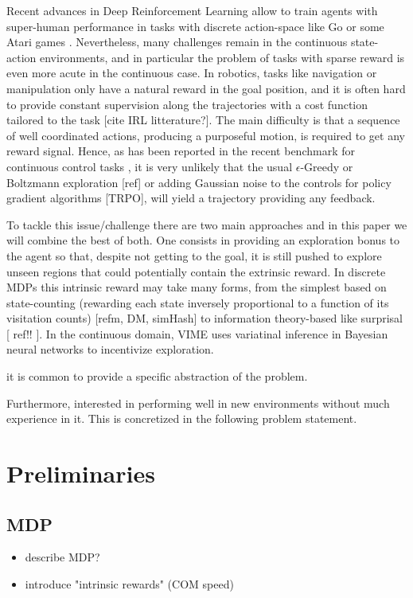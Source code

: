 \documentclass{article} %
\begin{document}
Recent advances in Deep Reinforcement Learning allow to train agents with super-human performance in tasks with discrete action-space like Go \cite{2016go} or some Atari games \cite{mnih2015human}. Nevertheless, many challenges remain in the continuous state-action environments, and in particular the problem of tasks with sparse reward is even more acute in the continuous case. In robotics, tasks like navigation or manipulation only have a natural reward in the goal position, and it is often hard to provide constant supervision along the trajectories with a cost function tailored to the task [cite IRL litterature?]. The main difficulty is that a sequence of well coordinated actions, producing a purposeful motion, is required to get any reward signal. Hence, as has been reported in the recent benchmark for continuous control tasks \cite{yuan2015}, it is very unlikely that the usual $\epsilon$-Greedy or Boltzmann exploration [ref] or adding Gaussian noise to the controls for policy gradient algorithms [TRPO], will yield a trajectory providing any feedback. 

To tackle this issue/challenge there are two main approaches and in this paper we will combine the best of both. One consists in providing an exploration bonus to the agent so that, despite not getting to the goal, it is still pushed to explore unseen regions that could potentially contain the extrinsic reward. In discrete MDPs this intrinsic reward may take many forms, from the simplest based on state-counting (rewarding each state inversely proportional to a function of its visitation counts) [refm, DM, simHash] to information theory-based like surprisal [ ref!! ]. In the continuous domain, VIME uses variatinal inference in Bayesian neural networks to incentivize exploration.

it is common to provide a specific abstraction of the problem.

Furthermore, interested in performing well in new environments without much experience in it. This is concretized in the following problem statement.



\section{Preliminaries}
\subsection{MDP}
\begin{itemize}
    \item describe MDP?
    \item introduce "intrinsic rewards" (COM speed)
\end{itemize}
\end{document}
